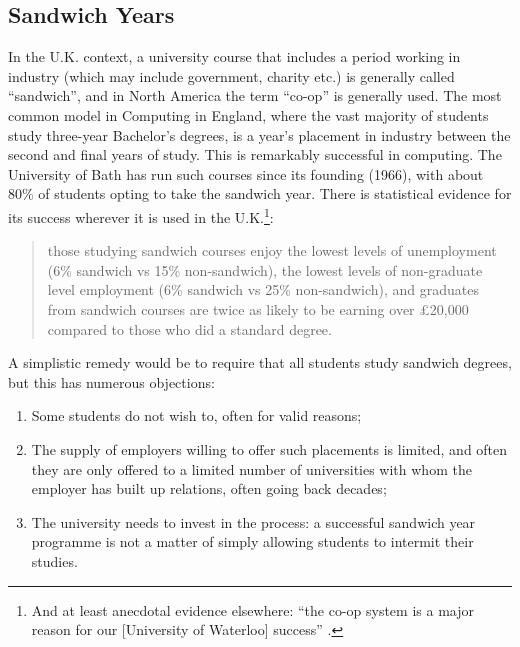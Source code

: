 \documentclass[sigconf,anonymous]{acmart}
\begin{document}
\subsection{Sandwich Years}

In the U.K. context, a university course that includes a period
working in industry (which may include government, charity etc.) is
generally called ``sandwich'', and in North America the term ``co-op''
is generally used. The most common model in Computing in England,
where the vast majority of students study three-year Bachelor's
degrees, is a year's placement in industry between the second and
final years of study. This is remarkably successful in computing. The
University of Bath has run such courses since its founding (1966),
with about 80\% of students opting to take the sandwich year. There is
statistical evidence for its success wherever it is used in the
U.K.\footnote{And at least anecdotal evidence elsewhere: ``the co-op
system is a major reason for our [University of Waterloo] success''
\cite{Watt2017a}.}:

\begin{quote} those studying sandwich courses enjoy the lowest levels
of unemployment (6\% sandwich vs 15\% non-sandwich), the lowest levels
of non-graduate level employment (6\% sandwich vs 25\% non-sandwich),
and graduates from sandwich courses are twice as likely to be earning
over \pounds20,000 compared to those who did a standard
degree. \cite[\P2.5]{Shadbolt2016a}
\end{quote}

A simplistic remedy would be to require that all students study
sandwich degrees, but this has numerous objections:

\begin{enumerate}
\item Some students do not wish to, often for valid reasons;
\item The supply of employers willing to offer such placements is
limited, and often they are only offered to a limited number of
universities with whom the employer has built up relations, often
going back decades;
\item The university needs to invest in the process: a successful
sandwich year programme is not a matter of simply allowing students to
intermit their studies.
\end{enumerate}
\end{document}

